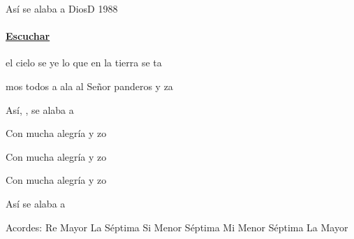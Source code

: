 \documentclass[12pt, spanish]{book}
\newcommand{\NotCCLIed}{\relax}
\begin{document}
    \begin{song}{Así se alaba a Dios}{D}
        {1988} %
        {}
        {} %
        {} %
        \ifChordBk
        \paragraph{\mbox{}\hfill\protect\href{https://open.spotify.com/intl-es/track/1dzPeHu5XTK4xoD3AhskaH}{Escuchar}\mbox{}\hfill}
        \fi


        \begin{SBOpGroup}
             el cielo se ye lo que en la tierra se ta
        \end{SBOpGroup}

        \begin{SBOpGroup}
            mos todos a ala al Señor  panderos y za
        \end{SBOpGroup}

        \begin{SBOpGroup}
            Así, ,  se alaba a 
        \end{SBOpGroup}

        \begin{SBOpGroup}
            Con mucha alegría y zo

            Con mucha alegría y zo

            Con mucha alegría y zo

            Así se alaba a 
        \end{SBOpGroup}

        \ifChordBk
        \begin{SBOpGroup}
            Acordes:
            \upchord{\D}\qquad Re Mayor \hfill
            \upchord{\Aseven}\qquad La S\'eptima \hfill\null\break
            \upchord{\Bmseven}\qquad Si Menor S\'eptima \hfill
            \upchord{\Emseven}\qquad Mi Menor S\'eptima \hfill\null\break
            \upchord{\A}\qquad La Mayor \hfill\null\break
        \end{SBOpGroup}
        \fi
    \end{song}
\end{document}
